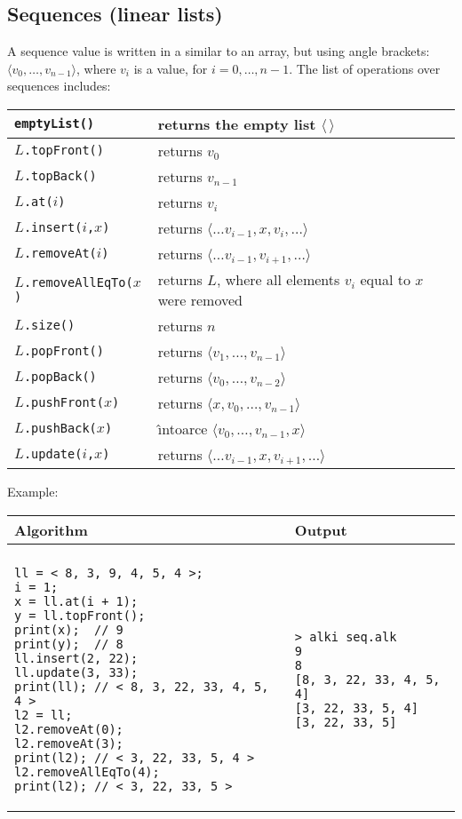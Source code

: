 \documentclass[a4paper]{report}
\begin{document}
\subsection{Sequences (linear lists)}

A sequence value is written in a similar to an array, but using angle brackets: $\langle v_0,\ldots,v_{n-1}\rangle$, where $v_i$ is a value, for $i=0,\ldots,n-1$. 
The list of operations over sequences includes:
\begin{center}
\begin{tabular}{|l|l|}
\hline
\texttt{emptyList()}
&
returns the empty list $\langle\,\rangle$\\
\hline
$L$\texttt{.topFront()}
&
returns $v_0$\\
\hline
$L$\texttt{.topBack()}
&
returns $v_{n-1}$\\
\hline
$L$\texttt{.at($i$)}
&
returns $v_i$\\
\hline
$L$\texttt{.insert($i$,$x$)}
&
returns $\langle\ldots v_{i-1},x,v_i,\ldots\rangle$\\
\hline
$L$\texttt{.removeAt($i$)}
&
returns $\langle\ldots v_{i-1},v_{i+1},\ldots\rangle$\\
\hline
$L$\texttt{.removeAllEqTo($x$)}
&
returns $L$, where all elements $v_i$ equal to $x$ were removed\\
\hline
$L$\texttt{.size()}
&
returns $n$\\
\hline
 $L$\texttt{.popFront()}
&
returns $\langle v_1,\ldots,v_{n-1}\rangle$\\
\hline
$L$\texttt{.popBack()}
&
returns $\langle v_0,\ldots,v_{n-2}\rangle$\\
\hline
$L$\texttt{.pushFront($x$)}
&
returns $\langle x,v_0,\ldots,v_{n-1}\rangle$\\
\hline
$L$\texttt{.pushBack($x$)}
&
\^{\i}ntoarce $\langle v_0,\ldots,v_{n-1},x\rangle$\\
\hline
$L$\texttt{.update($i$,$x$)}
&
returns $\langle\ldots v_{i-1},x,v_{i+1},\ldots\rangle$\\
\hline
\end{tabular}
\end{center}
Example:
\begin{center}
\begin{tabular}{ll}
Algorithm & Output\\
\hline
\\
\begin{minipage}{.55\textwidth}
\begin{verbatim}
ll = < 8, 3, 9, 4, 5, 4 >;
i = 1;
x = ll.at(i + 1);
y = ll.topFront();
print(x);  // 9
print(y);  // 8
ll.insert(2, 22);
ll.update(3, 33);
print(ll); // < 8, 3, 22, 33, 4, 5, 4 >
l2 = ll;
l2.removeAt(0);
l2.removeAt(3);
print(l2); // < 3, 22, 33, 5, 4 >
l2.removeAllEqTo(4);
print(l2); // < 3, 22, 33, 5 >
\end{verbatim}
\end{minipage}
&
\begin{minipage}{.45\textwidth}
\begin{verbatim}
> alki seq.alk 
9
8
[8, 3, 22, 33, 4, 5, 4]
[3, 22, 33, 5, 4]
[3, 22, 33, 5]
\end{verbatim}
\end{minipage}
\end{tabular}
\end{center}
\end{document}
